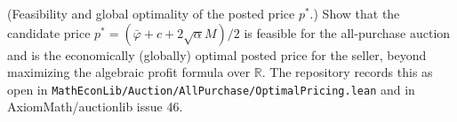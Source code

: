 \begin{theorem}\label{thm:open.optimal_price_feasibility}
(Feasibility and global optimality of the posted price $p^*$.) Show that the candidate price $p^* = (\bar\varphi + c + 2\sqrt\alpha M)/2$ is feasible for the all-purchase auction and is the economically (globally) optimal posted price for the seller, beyond maximizing the algebraic profit formula over $\mathbb R$. The repository records this as open in \texttt{MathEconLib/Auction/AllPurchase/OptimalPricing.lean} and in AxiomMath/auctionlib issue 46.
\end{theorem}
